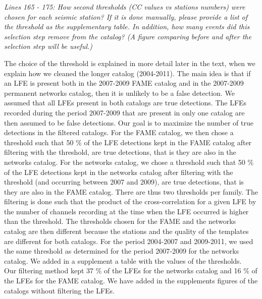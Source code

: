 \documentclass[letterpaper, 12pt]{article}
\begin{document}
\bigskip

\textit{Lines 165 - 175: How second thresholds (CC values vs stations numbers) were chosen for each seismic station? If it is done manually, please provide a list of the threshold as the supplementary table. In addition, how many events did this selection step remove from the catalog? (A figure comparing before and after the selection step will be useful.)}

\bigskip

The choice of the threshold is explained in more detail later in the text, when we explain how we cleaned the longer catalog (2004-2011). The main idea is that if an LFE is present both in the 2007-2009 FAME catalog and in the 2007-2009 permanent networks catalog, then it is unlikely to be a false detection. We assumed that all LFEs present in both catalogs are true detections. The LFEs recorded during the period 2007-2009 that are present in only one catalog are then assumed to be false detections. Our goal is to maximize the number of true detections in the filtered catalogs. For the FAME catalog, we then chose a threshold such that 50 \% of the LFE detections kept in the FAME catalog after filtering with the threshold, are true detections, that is they are also in the networks catalog. For the networks catalog, we chose a threshold such that 50 \% of the LFE detections kept in the networks catalog after filtering with the threshold (and occurring between 2007 and 2009), are true detections, that is they are also in the FAME catalog. There are thus two thresholds per family. The filtering is done such that the product of the cross-correlation for a given LFE by the number of channels recording at the time when the LFE occurred is higher than the threshold. The thresholds chosen for the FAME and the networks catalog are then different because the stations and the quality of the templates are different for both catalogs. For the period 2004-2007 and 2009-2011, we used the same threshold as determined for the period 2007-2009 for the networks catalog. We added in a supplement a table with the values of the thresholds. \\

Our filtering method kept 37 \% of the LFEs for the networks catalog and 16 \% of the LFEs for the FAME catalog. We have added in the supplements figures of the catalogs without filtering the LFEs.

\bigskip
\end{document}
